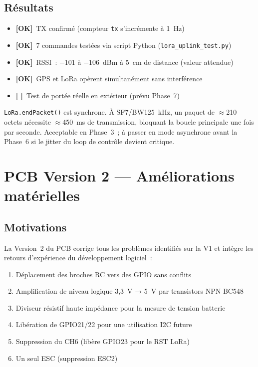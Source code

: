 \documentclass[12pt,a4paper]{article}
\newcommand{\done}{\textcolor{okborder}{\textbf{[OK]}}}
\newcommand{\todo}{\textcolor{warnborder}{\textbf{[ ]}}}
\begin{document}
\subsection{Résultats}

\begin{itemize}
  \item \done\ TX confirmé (compteur \texttt{tx} s'incrémente à 1~Hz)
  \item \done\ 7 commandes testées via script Python (\texttt{lora\_uplink\_test.py})
  \item \done\ RSSI~: $-101$ à $-106$~dBm à 5~cm de distance (valeur attendue)
  \item \done\ GPS et LoRa opèrent simultanément sans interférence
  \item \todo\ Test de portée réelle en extérieur (prévu Phase~7)
\end{itemize}

\begin{infobox}
  \texttt{LoRa.endPacket()} est synchrone. À SF7/BW125~kHz, un paquet
  de $\approx$210 octets nécessite $\approx$450~ms de transmission, bloquant
  la boucle principale une fois par seconde. Acceptable en Phase~3~; à passer
  en mode asynchrone avant la Phase~6 si le jitter du loop de contrôle
  devient critique.
\end{infobox}

\section{PCB Version 2 — Améliorations matérielles}

\subsection{Motivations}

La Version~2 du PCB corrige tous les problèmes identifiés sur la V1 et intègre
les retours d'expérience du développement logiciel~:

\begin{enumerate}
  \item Déplacement des broches RC vers des GPIO sans conflits
  \item Amplification de niveau logique 3,3~V → 5~V par transistors NPN BC548
  \item Diviseur résistif haute impédance pour la mesure de tension batterie
  \item Libération de GPIO21/22 pour une utilisation I2C future
  \item Suppression du CH6 (libère GPIO23 pour le RST LoRa)
  \item Un seul ESC (suppression ESC2)
\end{enumerate}
\end{document}

